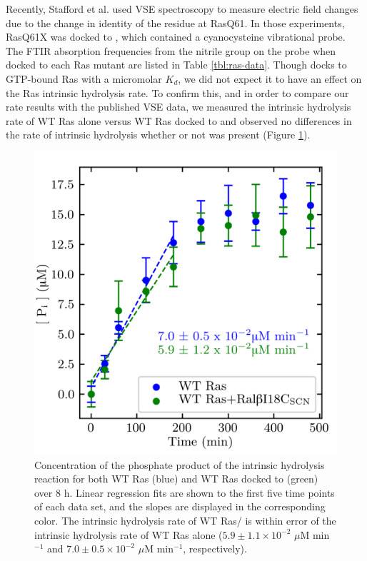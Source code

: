 Recently, Stafford et al. used VSE spectroscopy to measure electric field changes due to the change in identity of the residue at RasQ61\cite{Stafford2012}. 
In those experiments, RasQ61X was docked to \RalBSCN{}, which contained a cyanocysteine vibrational probe. 
The FTIR absorption frequencies from the nitrile group on the probe when docked to each Ras mutant are listed in Table \ref{tbl:ras-data}. 
Though \RalB{} docks to GTP-bound Ras with a micromolar $K_d$, we did not expect it to have an effect on the Ras intrinsic hydrolysis rate. 
To confirm this, and in order to compare our rate results with the published VSE data, we measured the intrinsic hydrolysis rate of WT Ras alone versus WT Ras docked to \RalBSCN{} and observed no differences in the rate of intrinsic hydrolysis whether or not \RalBSCN{} was present (Figure \ref{fig:ras-ral}).

\begin{figure}
    \center
    \includegraphics[width=\single]{figures-ras/Figure3.png}
    \caption[Comparison of the intrinsic Ras rate to the intrinsic Ras\RalBSCN{} rate]{
        Concentration of the phosphate product of the intrinsic hydrolysis reaction for both WT Ras (blue) and WT Ras docked to \RalBSCN{} (green) over 8 h. 
        Linear regression fits are shown to the first five time points of each data set, and the slopes are displayed in the corresponding color. 
        The intrinsic hydrolysis rate of WT Ras/\RalBSCN{} is within error of the intrinsic hydrolysis rate of WT Ras alone ($5.9 \pm 1.1 \times 10^{-2}$ $\mu$M min$^{-1}$ and $7.0 \pm 0.5 \times 10^{-2}$ $\mu$M min$^{-1}$, respectively).
    }
    \label{fig:ras-ral}
\end{figure}

